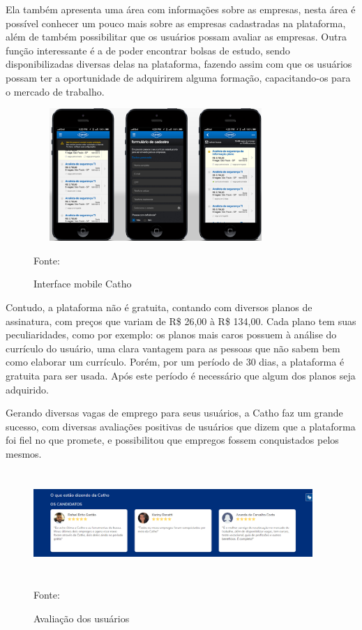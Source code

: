 Ela também apresenta uma área com informações sobre as empresas, nesta área é possível conhecer um pouco mais sobre as empresas cadastradas na plataforma, além de também possibilitar que os usuários possam avaliar as empresas. Outra função interessante é a de poder encontrar bolsas de estudo, sendo disponibilizadas diversas delas na plataforma, fazendo assim com que os usuários possam ter a oportunidade de adquirirem alguma formação, capacitando-os para o mercado de trabalho.


\begin{figure}[!h]
	\centering
	\caption{Interface mobile Catho}
	\includegraphics[width=350px, height=190px]{./images/cathoMobile.png}
	\par {Fonte: \cite{catho}}
\end{figure}

\newpage

Contudo, a plataforma não é gratuita, contando com diversos planos de assinatura, com preços que variam de R\$ 26,00 à R\$ 134,00. Cada plano tem suas peculiaridades, como por exemplo: os planos mais caros possuem à análise do currículo do usuário, uma clara vantagem para as pessoas que não sabem bem como elaborar um currículo. Porém, por um período de 30 dias, a plataforma é gratuita para ser usada. Após este período é necessário que algum dos planos seja adquirido.

Gerando diversas vagas de emprego para seus usuários, a Catho faz um grande sucesso, com diversas avaliações positivas de usuários que dizem que a plataforma foi fiel no que promete, e possibilitou que empregos fossem conquistados pelos mesmos.

\begin{figure}[!h]
	\centering
	\caption{Avaliação dos usuários}
	\includegraphics[width=400px, height=150px]{./images/cathoMobile1.png}
	\par {Fonte: \cite{catho-3}}
\end{figure}

